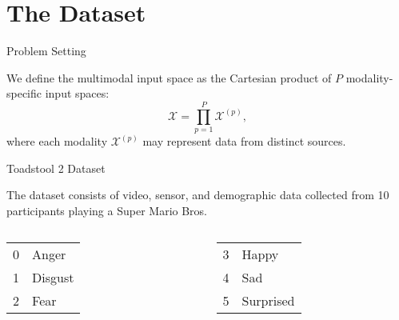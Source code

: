 \section{The Dataset}

\begin{frame}{Problem Setting}
	\begin{block}{}
		We define the multimodal input space as the Cartesian product of $P$ modality-specific input spaces:
		\[
		\mathcal{X} = \prod_{p=1}^{P} \mathcal{X}^{(p)},
		\]
		where each modality $\mathcal{X}^{(p)}$ may represent data from distinct sources.
	\end{block}
	
\end{frame}



\begin{frame}{Toadstool 2 Dataset}
\begin{block}{}
The dataset consists of video, sensor, and demographic data collected from 10 participants playing a Super Mario Bros.
\end{block}

\vspace{-0.5em}

		\begin{columns}[T] %
		\begin{column}{0.5\textwidth}
			\begin{center}

  \begin{columns}[t]
	\centering\footnotesize
	\begin{tabular}{r l}
		0 & Anger   \\
		1 & Disgust \\
		2 & Fear    
	\end{tabular}
	
	\centering\footnotesize
	\begin{tabular}{r l}
		3 & Happy     \\
		4 & Sad       \\
		5 & Surprised 
	\end{tabular}
	

\end{columns}
\end{center}
\end{column}
\end{columns}
\end{frame}
